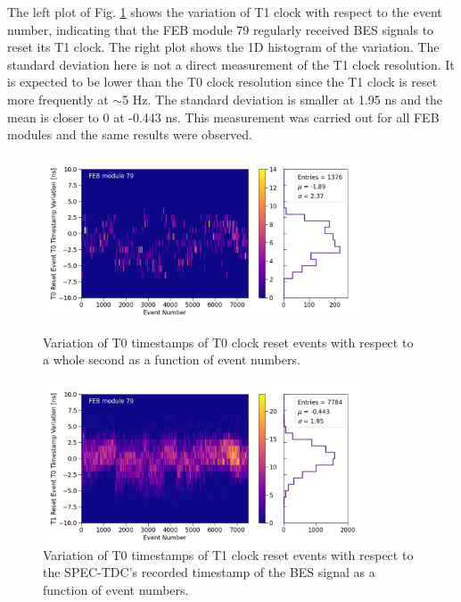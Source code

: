 
The left plot of Fig. \ref{fig:UpstreamT1StabilityCombinedBoard79} shows the variation of T1 clock with respect to the event number, indicating that the FEB module 79 regularly received BES signals to reset its T1 clock.
The right plot shows the 1D histogram of the variation.
The standard deviation here is not a direct measurement of the T1 clock resolution.
It is expected to be lower than the T0 clock resolution since the T1 clock is reset more frequently at $\sim$5 Hz.
The standard deviation is smaller at 1.95 ns and the mean is closer to 0 at -0.443 ns.
This measurement was carried out for all FEB modules and the same results were observed.

\begin{figure}[ht!] 
\centering    
\includegraphics[width=0.85\textwidth]{upstream_T0stability_combined_board79}
\caption[Variation of T0 Timestamps of T0 Clock Reset Events Against Event Number]{
Variation of T0 timestamps of T0 clock reset events with respect to a whole second as a function of event numbers.
}
\label{fig:UpstreamT0StabilityCombinedBoard79}
\centering    
\includegraphics[width=0.85\textwidth]{upstream_T1stability_combined_board79}
\caption[Variation of T0 Timestamps of T1 Clock Reset Events Against Event Number]{
Variation of T0 timestamps of T1 clock reset events with respect to the SPEC-TDC's recorded timestamp of the BES signal as a function of event numbers.
}
\label{fig:UpstreamT1StabilityCombinedBoard79}
\end{figure}

